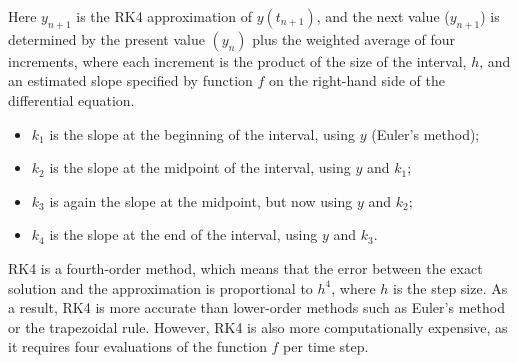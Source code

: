 \documentclass  [
  paper    = a4,
  BCOR     = 10mm,
  twoside,
  fontsize = 12pt,
  fleqn,
  toc      = bibnumbered,
  toc      = listofnumbered,
  numbers  = noendperiod,
  headings = normal,
  listof   = leveldown,
  version  = 3.03
]                                       {scrreprt}
\newcommand{\<}{\langle}
\renewcommand{\>}{\rangle}
\begin{document}
  	Here $y_{n+1}$ is the RK4 approximation of $y(t_{n+1})$, and the next value ($y_{n+1}$) is determined by the present value $(y_n)$ plus the weighted average of four increments, where each increment is the product of the size of the interval, $h$, and an estimated slope specified by function $f$ on the right-hand side of the differential equation.
  	\begin{itemize}
  		\item  $k_1$ is the slope at the beginning of the interval, using $y$  (Euler's method);
  		\item  $k_2$ is the slope at the midpoint of the interval, using $y$ and $k_1$;
  		\item  $k_3$ is again the slope at the midpoint, but now using $y$ and $k_2$;
  		\item $k_4$ is the slope at the end of the interval, using $y$ and $k_3$.
  	\end{itemize}
  
 RK4 is a fourth-order method, which means that the error between the exact solution and the approximation is proportional to $h^4$, where $h$ is the step size. As a result, RK4 is more accurate than lower-order methods such as Euler's method or the trapezoidal rule. However, RK4 is also more computationally expensive, as it requires four evaluations of the function $f$ per time step. 
  	
  	
    \newpage
    {}
     \newpage
    
    
 \newpage
\end{document}
